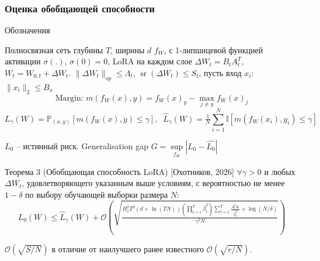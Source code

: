 \documentclass[10pt]{beamer}
\DeclareMathOperator{\sr}{sr}
\begin{document}
\begin{frame}
    \frametitle{Оценка обобщающей способности}
    \vspace{-0.2cm}
    \begin{block}{Обозначения}

        Полносвязная сеть глубины $T$, ширины $d$ $f_W$, с 1-липшицевой функцией активации $\sigma(.)$, $\sigma(0)=0$, LoRA на каждом слое $\Delta W_t = B_t A_t^T$, $W_t = W_{0,t} + \Delta W_t$. $\|\Delta W_t\|_{op} \leqslant \Lambda_t$, $\sr(\Delta W_t) \leqslant S_t$, пусть вход $x_i:$ $\|x_i\|_2 \leqslant B_x$
        \vspace{-0.15cm}
        $$\text{Margin: } m(f_W(x), y) = f_W(x)_y - \max_{j \neq y} f_W(x)_j$$
        \vspace{-0.5cm}
        $$L_\gamma(W) = \mathbb{P}_{(x,y)}[m(f_W(x), y) \le \gamma], \;\; \widehat{L}_\gamma(W) = \tfrac{1}{N}\sum_{i=1}^N \mathbb{I}[m(f_W(x_i), y_i) \le \gamma]$$

        $L_0$ -- истинный риск. Generalisation gap $G = \sup\limits_{f_W} |L_0 - \hat{L_0}|$
    \end{block}

    \vspace{-0.2cm}
    \begin{block}{Теорема 3 (Обобщающая способность LoRA) [Охотников, 2026]}
        $\forall \gamma > 0$ и любых $\Delta W_t$, удовлетворяющего указанным выше условиям, с вероятностью не менее $1-\delta$ по выбору обучающей выборки размера $N$:
        \vspace{-0.1cm}
        $$L_0(W) \leqslant \widehat{L}_\gamma(W) + \mathcal{O}\!\left(\!\sqrt{\tfrac{B_x^2 T^2 (d + \ln(TN)) \left( \prod_{t=1}^T \bar{\beta}_t^2 \right) \sum_{t=1}^T \frac{\Lambda_t^2 S_t}{\bar{\beta}_t^2} + \log(N/\delta)}{\gamma^2 N}}\right)$$

        \vspace{-0.4cm}

         $\mathcal{O}(\sqrt{S/N})$ в отличие от наилучшего ранее известного $\mathcal{O}(\sqrt{r/N})$.
    \end{block}
\end{frame}
\end{document}
